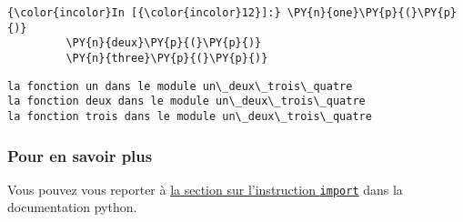     \begin{Verbatim}[commandchars=\\\{\},frame=single,framerule=0.3mm,rulecolor=\color{cellframecolor}]
{\color{incolor}In [{\color{incolor}12}]:} \PY{n}{one}\PY{p}{(}\PY{p}{)}
         \PY{n}{deux}\PY{p}{(}\PY{p}{)}
         \PY{n}{three}\PY{p}{(}\PY{p}{)}
\end{Verbatim}


    \begin{Verbatim}[commandchars=\\\{\},frame=single,framerule=0.3mm,rulecolor=\color{cellframecolor}]
la fonction un dans le module un\_deux\_trois\_quatre
la fonction deux dans le module un\_deux\_trois\_quatre
la fonction trois dans le module un\_deux\_trois\_quatre
\end{Verbatim}

    \hypertarget{pour-en-savoir-plus}{%
\subsubsection{Pour en savoir plus}\label{pour-en-savoir-plus}}

    Vous pouvez vous reporter à
\href{https://docs.python.org/3/reference/simple_stmts.html\#the-import-statement}{la
section sur l'instruction \texttt{import}} dans la documentation python.


    
    
    
